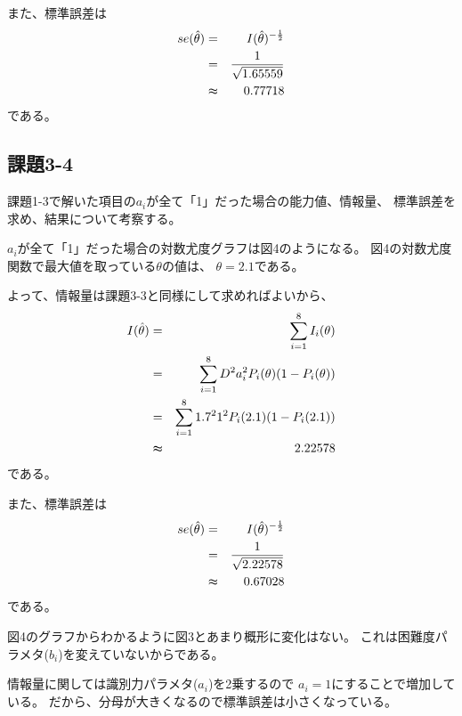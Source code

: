 \documentclass[12pt]{jarticle}
\begin{document}
また、標準誤差は
\begin{eqnarray*}
    se(\hat{\theta})&=&I(\hat{\theta})^{-\frac{1}{2}}\\
    &= &\frac{1}{\sqrt{ 1.65559}}\\
    &\thickapprox& 0.77718
\end{eqnarray*}
である。

\subsection{課題3-4}
\begin{shadebox}
    課題1-3で解いた項目の$a_i$が全て「1」だった場合の能力値、情報量、
    標準誤差を求め、結果について考察する。
\end{shadebox}



$a_i$が全て「1」だった場合の対数尤度グラフは図4のようになる。
図4の対数尤度関数で最大値を取っている$\theta$の値は、
$\theta=2.1$である。

よって、情報量は課題3-3と同様にして求めればよいから、
\begin{eqnarray*}
    I(\hat{\theta})&=&\sum_{i=1}^{8}{I_i({\theta})}\\
    &=&\sum_{i=1}^{8}{D^2a_i^2P_i(\theta)(1-P_i(\theta))}\\
    &=&\sum_{i=1}^{8}{1.7^2 1^2P_i(2.1)(1-P_i(2.1))}\\
    &\thickapprox & 2.22578
\end{eqnarray*}
である。

また、標準誤差は
\begin{eqnarray*}
    se(\hat{\theta})&=&I(\hat{\theta})^{-\frac{1}{2}}\\
    &= &\frac{1}{\sqrt{2.22578}}\\
    &\thickapprox& 0.67028
\end{eqnarray*}
である。

図4のグラフからわかるように図3とあまり概形に変化はない。
これは困難度パラメタ($b_i$)を変えていないからである。

情報量に関しては識別力パラメタ($a_i$)を2乗するので
$a_i=1$にすることで増加している。
だから、分母が大きくなるので標準誤差は小さくなっている。
\end{document}
